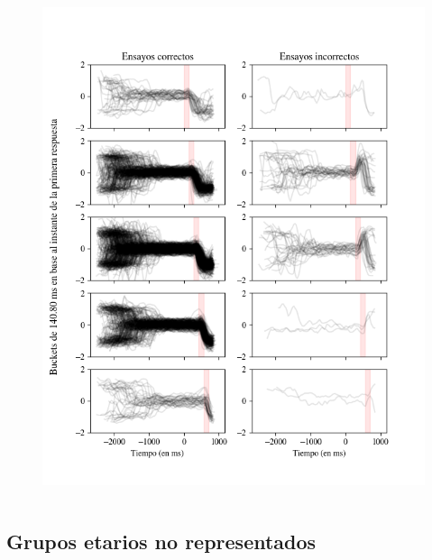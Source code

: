 \documentclass[aspectratio=169]{beamer}
\begin{document}
\begin{frame}{~}
\begin{columns}
\begin{column}{0.5\textwidth}
\begin{figure}
        \includegraphics[width=\linewidth]{img/second-disaggregated-antisaccades.png}
      \end{figure}
    \end{column}
  \end{columns}
\end{frame}

\subsection{Grupos etarios no representados}
\end{document}
